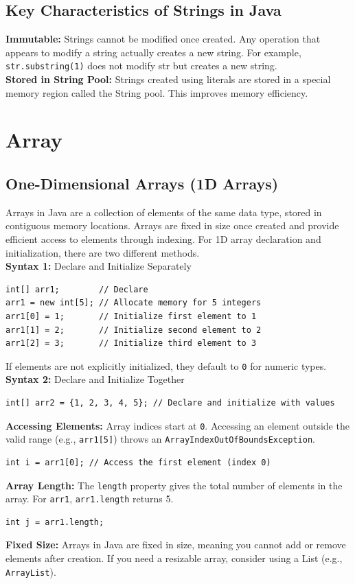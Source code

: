 \documentclass[letterpaper,12pt]{article}
\begin{document}
\subsection{Key Characteristics of Strings in Java}
\textbf{Immutable:} Strings cannot be modified once created. Any operation that appears to modify a string actually creates a new string. For example, \texttt{str.substring(1)} does not modify str but creates a new string.\\
\textbf{Stored in String Pool:} Strings created using literals are stored in a special memory region called the String pool. This improves memory efficiency.

\section{Array}
\subsection{One-Dimensional Arrays (1D Arrays)}
Arrays in Java are a collection of elements of the same data type, stored in contiguous memory locations. Arrays are fixed in size once created and provide efficient access to elements through indexing. For 1D array declaration and initialization, there are two different methods.\\
\textbf{Syntax 1:} Declare and Initialize Separately
\begin{verbatim}
int[] arr1;        // Declare
arr1 = new int[5]; // Allocate memory for 5 integers
arr1[0] = 1;       // Initialize first element to 1
arr1[1] = 2;       // Initialize second element to 2
arr1[2] = 3;       // Initialize third element to 3
\end{verbatim}
If elements are not explicitly initialized, they default to \texttt{0} for numeric types.\\
\textbf{Syntax 2:} Declare and Initialize Together
\begin{verbatim}
int[] arr2 = {1, 2, 3, 4, 5}; // Declare and initialize with values
\end{verbatim}
\textbf{Accessing Elements:} Array indices start at \texttt{0}. Accessing an element outside the valid range (e.g., \texttt{arr1[5]}) throws an \texttt{ArrayIndexOutOfBoundsException}.
\begin{verbatim}
int i = arr1[0]; // Access the first element (index 0)
\end{verbatim}
\textbf{Array Length:} The \texttt{length} property gives the total number of elements in the array. For \texttt{arr1}, \texttt{arr1.length} returns 5.
\begin{verbatim}
int j = arr1.length;
\end{verbatim}
\textbf{Fixed Size: }Arrays in Java are fixed in size, meaning you cannot add or remove elements after creation. If you need a resizable array, consider using a List (e.g., \texttt{ArrayList}).
\end{document}
